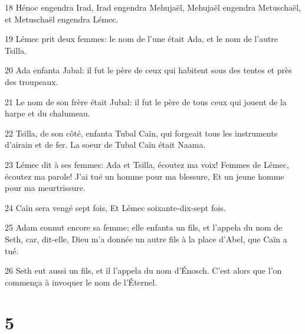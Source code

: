 \par 18 Hénoc engendra Irad, Irad engendra Mehujaël, Mehujaël engendra Metuschaël, et Metuschaël engendra Lémec.
\par 19 Lémec prit deux femmes: le nom de l'une était Ada, et le nom de l'autre Tsilla.
\par 20 Ada enfanta Jabal: il fut le père de ceux qui habitent sous des tentes et près des troupeaux.
\par 21 Le nom de son frère était Jubal: il fut le père de tous ceux qui jouent de la harpe et du chalumeau.
\par 22 Tsilla, de son côté, enfanta Tubal Caïn, qui forgeait tous les instruments d'airain et de fer. La soeur de Tubal Caïn était Naama.
\par 23 Lémec dit à ses femmes: Ada et Tsilla, écoutez ma voix! Femmes de Lémec, écoutez ma parole! J'ai tué un homme pour ma blessure, Et un jeune homme pour ma meurtrissure.
\par 24 Caïn sera vengé sept fois, Et Lémec soixante-dix-sept fois.
\par 25 Adam connut encore sa femme; elle enfanta un fils, et l'appela du nom de Seth, car, dit-elle, Dieu m'a donnée un autre fils à la place d'Abel, que Caïn a tué.
\par 26 Seth eut aussi un fils, et il l'appela du nom d'Énosch. C'est alors que l'on commença à invoquer le nom de l'Éternel.

\chapter{5}

